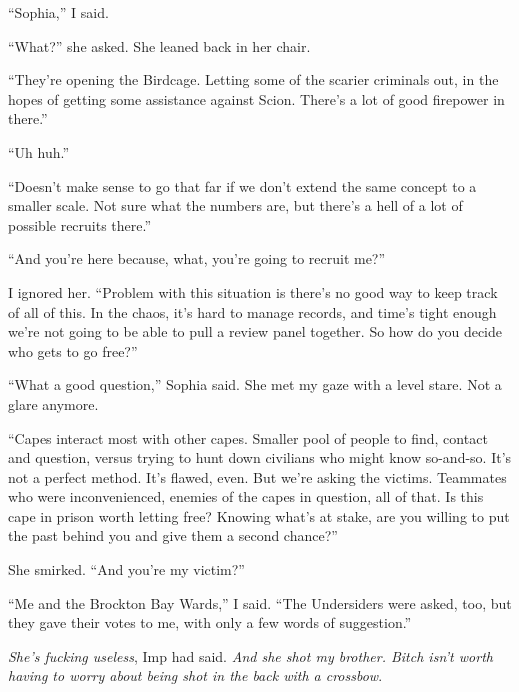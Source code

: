 ``Sophia,'' I said.



``What?'' she asked.  She leaned back in her chair.



``They're opening the Birdcage.  Letting some of the scarier criminals out, in the hopes of getting some assistance against Scion.  There's a lot of good firepower in there.''



``Uh huh.''



``Doesn't make sense to go that far if we don't extend the same concept to a smaller scale.  Not sure what the numbers are, but there's a hell of a lot of possible recruits there.''



``And you're here because, what, you're going to recruit me?''



I ignored her.  ``Problem with this situation is there's no good way to keep track of all of this.  In the chaos, it's hard to manage records, and time's tight enough we're not going to be able to pull a review panel together.  So how do you decide who gets to go free?''



``What a good question,'' Sophia said.  She met my gaze with a level stare.  Not a glare anymore.



``Capes interact most with other capes.  Smaller pool of people to find, contact and question, versus trying to hunt down civilians who might know so-and-so.  It's not a perfect method.  It's flawed, even.  But we're asking the victims.  Teammates who were inconvenienced, enemies of the capes in question, all of that.  Is this cape in prison worth letting free?  Knowing what's at stake, are you willing to put the past behind you and give them a second chance?''



She smirked.  ``And you're my victim?''



``Me and the Brockton Bay Wards,'' I said.  ``The Undersiders were asked, too, but they gave their votes to me, with only a few words of suggestion.''



\emph{She's fucking useless}, Imp had said.  \emph{And she shot my brother.  Bitch isn't worth having to worry about being shot in the back with a crossbow}.



